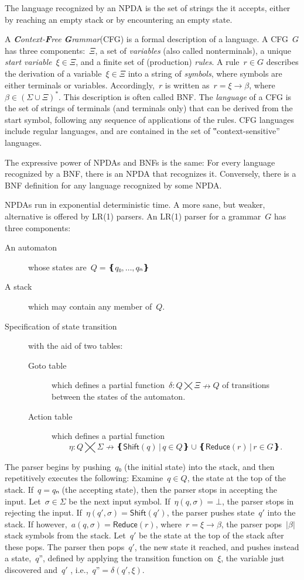 The language recognized by an NPDA is the set of strings the it accepts,
  either by reaching an empty stack or by encountering an empty state. 

A \emph{\textbf Context-\textbf Free \textbf Grammar}(CFG) is a formal description of a language.
A CFG~$G$ has three components:~$Ξ$,
a set of \emph{variables} (also called nonterminals), a unique \emph{start variable}~$ξ∈Ξ$, and
  a finite set of (production) \emph{rules}.
A rule~$r∈G$ describes the derivation of a variable~$ξ∈Ξ$ into
  a string of \emph{symbols}, where symbols are either terminals or variables.
Accordingly,~$r$ is written as~$r=ξ→β$, where~$β∈\left(Σ∪Ξ\right)^*$.
This description is often called BNF.
The \emph{language} of a CFG is the set of strings of terminals (and terminals only)
  that can be derived from the start symbol, following any sequence of applications of the rules.
CFG languages include regular languages, and are contained in the set
  of ‟context-sensitive” languages.

The expressive power of NPDAs and BNFs is the same: 
  For every language recognized by a BNF, there is an NPDA that recognizes it. 
Conversely, there is a BNF definition for any language recognized by some NPDA. 

NPDAs run in exponential deterministic time. 
A more sane, but weaker, alternative is offered by LR(1) parsers.  
An LR(1) parser for a grammar~$G$ has three components:
\begin{description}
  \item[An automaton] whose states are~$Q=❴q₀,…,qₙ❵$
  \item[A stack] which may contain any member of~$Q$.
  \item[Specification of state transition] with the aid of two tables:
        \begin{description}
          \item[Goto table] which defines a partial function~$δ:Q⨉Ξ↛Q$ of transitions
          between the states of the automaton.
          \item[Action table] which
            defines a partial function\[η:Q⨉Σ↛ ❴ \textsf{Shift}(q) \,|\, q∈Q❵ ∪ ❴\textsf{Reduce}(r) \,| \, r∈G❵.\]
        \end{description}
\end{description}
The parser begins by pushing~$q₀$ (the initial state) into the stack,
and then repetitively executes the following:
Examine~$q∈Q$, the state at the top of the stack.
If~$q=qₙ$ (the accepting state), then the parser stops in accepting the input.
Let~$σ∈Σ$ be the next input symbol.
If~$η(q,σ)=⊥$, the parser stops in rejecting the input.
If~$η(q',σ) = \textsf{Shift}(q')$, the parser pushes state~$q'$ into the stack.
If however,~$a(q,σ) = \textsf{Reduce}(r)$,
where~$r=ξ→β$,
the parser pops~$|β|$ stack symbols from the stack.
Let~$q'$ be the state at the top of the stack after these pops.
The parser then pops~$q'$, the new state it reached,
  and pushes instead a state,~$q”$, 
  defined by applying the transition function on~$ξ$, the variable just discovered and~$q'$ , i.e.,~$q”=δ(q',ξ)$.


